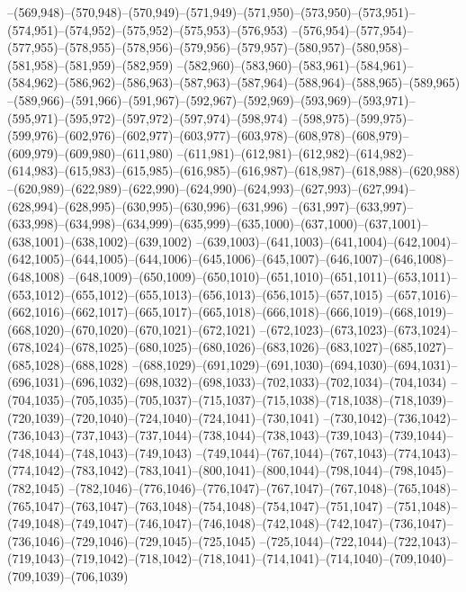 --(569,948)--(570,948)--(570,949)--(571,949)--(571,950)--(573,950)--(573,951)--(574,951)--(574,952)--(575,952)--(575,953)--(576,953)
--(576,954)--(577,954)--(577,955)--(578,955)--(578,956)--(579,956)--(579,957)--(580,957)--(580,958)--(581,958)--(581,959)--(582,959)
--(582,960)--(583,960)--(583,961)--(584,961)--(584,962)--(586,962)--(586,963)--(587,963)--(587,964)--(588,964)--(588,965)--(589,965)
--(589,966)--(591,966)--(591,967)--(592,967)--(592,969)--(593,969)--(593,971)--(595,971)--(595,972)--(597,972)--(597,974)--(598,974)
--(598,975)--(599,975)--(599,976)--(602,976)--(602,977)--(603,977)--(603,978)--(608,978)--(608,979)--(609,979)--(609,980)--(611,980)
--(611,981)--(612,981)--(612,982)--(614,982)--(614,983)--(615,983)--(615,985)--(616,985)--(616,987)--(618,987)--(618,988)--(620,988)
--(620,989)--(622,989)--(622,990)--(624,990)--(624,993)--(627,993)--(627,994)--(628,994)--(628,995)--(630,995)--(630,996)--(631,996)
--(631,997)--(633,997)--(633,998)--(634,998)--(634,999)--(635,999)--(635,1000)--(637,1000)--(637,1001)--(638,1001)--(638,1002)--(639,1002)
--(639,1003)--(641,1003)--(641,1004)--(642,1004)--(642,1005)--(644,1005)--(644,1006)--(645,1006)--(645,1007)--(646,1007)--(646,1008)--(648,1008)
--(648,1009)--(650,1009)--(650,1010)--(651,1010)--(651,1011)--(653,1011)--(653,1012)--(655,1012)--(655,1013)--(656,1013)--(656,1015)--(657,1015)
--(657,1016)--(662,1016)--(662,1017)--(665,1017)--(665,1018)--(666,1018)--(666,1019)--(668,1019)--(668,1020)--(670,1020)--(670,1021)--(672,1021)
--(672,1023)--(673,1023)--(673,1024)--(678,1024)--(678,1025)--(680,1025)--(680,1026)--(683,1026)--(683,1027)--(685,1027)--(685,1028)--(688,1028)
--(688,1029)--(691,1029)--(691,1030)--(694,1030)--(694,1031)--(696,1031)--(696,1032)--(698,1032)--(698,1033)--(702,1033)--(702,1034)--(704,1034)
--(704,1035)--(705,1035)--(705,1037)--(715,1037)--(715,1038)--(718,1038)--(718,1039)--(720,1039)--(720,1040)--(724,1040)--(724,1041)--(730,1041)
--(730,1042)--(736,1042)--(736,1043)--(737,1043)--(737,1044)--(738,1044)--(738,1043)--(739,1043)--(739,1044)--(748,1044)--(748,1043)--(749,1043)
--(749,1044)--(767,1044)--(767,1043)--(774,1043)--(774,1042)--(783,1042)--(783,1041)--(800,1041)--(800,1044)--(798,1044)--(798,1045)--(782,1045)
--(782,1046)--(776,1046)--(776,1047)--(767,1047)--(767,1048)--(765,1048)--(765,1047)--(763,1047)--(763,1048)--(754,1048)--(754,1047)--(751,1047)
--(751,1048)--(749,1048)--(749,1047)--(746,1047)--(746,1048)--(742,1048)--(742,1047)--(736,1047)--(736,1046)--(729,1046)--(729,1045)--(725,1045)
--(725,1044)--(722,1044)--(722,1043)--(719,1043)--(719,1042)--(718,1042)--(718,1041)--(714,1041)--(714,1040)--(709,1040)--(709,1039)--(706,1039)
